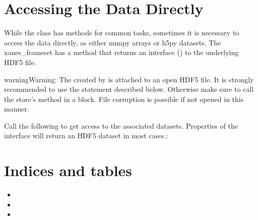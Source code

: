 \documentclass[letterpaper,10pt,english]{sphinxmanual}
\begin{document}
\chapter{Accessing the Data Directly}
\label{\detokenize{data_stores::doc}}\label{\detokenize{data_stores:accessing-the-data-directly}}
While the  class has methods for common tasks,
sometimes it is necessary to access the data directly, as either numpy
arrays or h5py datasets. The xanes\_frameset has a  method
that returns an interface () to the underlying HDF5 file.

\begin{sphinxadmonition}{warning}{Warning:}
The  created by  is
attached to an open HDF5 file. It is strongly recommended to use
the  statement described below. Otherwise make sure to call
the store's  method in a 
block. File corruption is possible if not opened in this manner.
\end{sphinxadmonition}

Call the following to get access to the associated datasets. Properties of the interface will
return an HDF5 dataset in most cases.:

\begin{sphinxVerbatim}[commandchars=\\\{\}]
   
  

   
          
        
\end{sphinxVerbatim}


\chapter{Indices and tables}
\label{\detokenize{index:indices-and-tables}}\begin{itemize}
\item {} 

\item {} 

\item {} 

\end{itemize}



\renewcommand{\indexname}{Index}
\printindex
\end{document}
